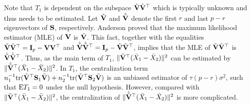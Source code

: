 \documentclass[times,sort&compress,3p]{elsarticle}
\newcommand{\mytr}{ {\rm tr} }
\newcommand{\myE}{ {\rm E} }
\theoremstyle{plain}
\theoremstyle{definition}
\newtheorem{remark}{\quad\quad Remark}
\theoremstyle{remark}
\begin{document}


Note that $T_1$ %
is dependent on the subspace $\tilde{\mathbf{V}}\tilde{\mathbf{V}}^\top $ which is typically unknown and thus needs to be estimated.
Let $\hat{\mathbf{V}}$ and $\hat{\tilde{\mathbf{V}}}$ denote the first $r$ and last $p-r$ eigenvectors of $\mathbf{S}$, respectively.
Anderson \cite{Anderson1986Asymptotic} proved that the maximum likelihood estimator (MLE) of $\mathbf{V}$ is $\hat{\mathbf{V}}$.
This fact, together with the equalities $\tilde{\mathbf{V}}\tilde{\mathbf{V}}^\top = \mathbf{I}_p-\mathbf{V}\mathbf{V}^\top $ and $\hat{\tilde{\mathbf{V}}}\hat{\tilde{\mathbf{V}}}^\top = \mathbf{I}_p-\hat{\mathbf{V}}\hat{\mathbf{V}}^\top $, implies that 
the MLE of $\tilde{\mathbf{V}}\tilde{\mathbf{V}}^\top $ is $\hat{\tilde{\mathbf{V}}}\hat{\tilde{\mathbf{V}}}^\top $.
Thus, as the main term of $T_1$,
$\|\tilde{\mathbf{V}}^\top  (\bar{X}_1-\bar{X}_2)\|^2$ can be estimated by $\|\hat{\tilde{\mathbf{V}}}^\top  (\bar{X}_1-\bar{X}_2)\|^2$.
In $T_1$, the centralization term $n_1^{-1}\mytr(\tilde{\BV}^\top  \BS_1\tilde{\BV})+n_2^{-1}\mytr(\tilde{\BV}^\top  \BS_2\tilde{\BV})$ is an unbiased estimator of $\tau (p-r)\sigma^2$, such that $\myE T_1=0$ under the null hypothesis.
However, compared with $\|\tilde{\mathbf{V}}^\top  (\bar{X}_1-\bar{X}_2)\|^2$, the centralization of $\|\hat{\tilde{\mathbf{V}}}^\top  (\bar{X}_1-\bar{X}_2)\|^2$ is more complicated.
\end{document}
